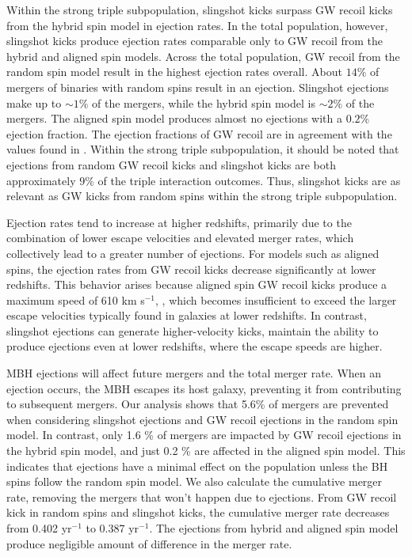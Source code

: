 \documentclass[11pt, letterpaper]{article}
\newcommand{\kms}{km s$^{-1}$}
\begin{document}
Within the strong triple subpopulation, slingshot kicks surpass GW recoil kicks from the hybrid spin model in ejection rates. In the total population, however, slingshot kicks produce ejection rates comparable only to GW recoil from the hybrid and aligned spin models. Across the total population, GW recoil from the random spin model result in the highest ejection rates overall. About $14 \%$ of mergers of binaries with random spins result in an ejection. Slingshot ejections make up to $\sim 1\%$ of the mergers, while the hybrid spin model is $\sim 2\%$ of the mergers. The aligned spin model produces almost no ejections with a $0.2 \%$ ejection fraction. The ejection fractions of GW recoil are in agreement with the values found in \cite{Blecha2016}. Within the strong triple subpopulation, it should be noted that ejections from random GW recoil kicks and slingshot kicks are both approximately $9 \%$ of the triple interaction outcomes. Thus, slingshot kicks are as relevant as GW kicks from random spins within the strong triple subpopulation.

Ejection rates tend to increase at higher redshifts, primarily due to the combination of lower escape velocities and elevated merger rates, which collectively lead to a greater number of ejections. For models such as aligned spins, the ejection rates from GW recoil kicks decrease significantly at lower redshifts. This behavior arises because aligned spin GW recoil kicks produce a maximum speed of 610 \kms, , which becomes insufficient to exceed the larger escape velocities typically found in galaxies at lower redshifts. In contrast, slingshot ejections can generate higher-velocity kicks, maintain the ability to produce ejections even at lower redshifts, where the escape speeds are higher.



MBH ejections will affect future mergers and the total merger rate. When an ejection occurs, the MBH escapes its host galaxy, preventing it from contributing to subsequent mergers. Our analysis shows that 5.6\% of mergers are prevented when considering slingshot ejections and GW recoil ejections in the random spin model. In contrast, only 1.6 \% of mergers are impacted by GW recoil ejections in the hybrid spin model, and just 0.2 \% are affected in the aligned spin model. This indicates that ejections have a minimal effect on the population unless the BH spins follow the random spin model. We also calculate the cumulative merger rate, removing the mergers that won't happen due to ejections. From GW recoil kick in random spins and slingshot kicks, the cumulative merger rate decreases from 0.402 yr$^{-1}$ to 0.387 yr$^{-1}$. The ejections from hybrid and aligned spin model produce negligible amount of difference in the merger rate.
\end{document}
